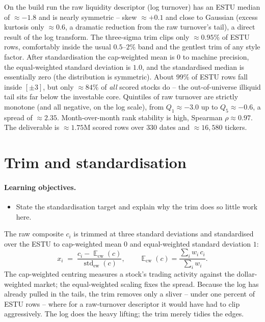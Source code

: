 \documentclass[11pt]{article}
\theoremstyle{definition}
\theoremstyle{plain}
\theoremstyle{remark}
\DeclareMathOperator{\std}{std}
\DeclareMathOperator*{\avg}{\mathbb{E}}
\begin{document}
\begin{observed}
On the build run the raw liquidity descriptor (log turnover) has an ESTU median of $\approx -1.8$ and is nearly symmetric -- skew $\approx +0.1$ and close to Gaussian (excess kurtosis only $\approx 0.6$, a dramatic reduction from the raw turnover's tail), a direct result of the log transform. The three-sigma trim clips only $\approx 0.95\%$ of ESTU rows, comfortably inside the usual $0.5$--$2\%$ band and the gentlest trim of any style factor. After standardisation the cap-weighted mean is $0$ to machine precision, the equal-weighted standard deviation is $1.0$, and the standardised median is essentially zero (the distribution is symmetric). About $99\%$ of ESTU rows fall inside $[\pm 3]$, but only $\approx 84\%$ of \emph{all} scored stocks do -- the out-of-universe illiquid tail sits far below the investable core. Quintiles of raw turnover are strictly monotone (and all negative, on the log scale), from $Q_1 \approx -3.0$ up to $Q_5 \approx -0.6$, a spread of $\approx 2.35$. Month-over-month rank stability is high, Spearman $\rho \approx 0.97$. The deliverable is $\approx 1.75$M scored rows over $330$ dates and $\approx 16{,}580$ tickers.
\end{observed}

\section{Trim and standardisation}\label{sec:std}

\paragraph{Learning objectives.}
\begin{itemize}[leftmargin=1.4em,topsep=2pt]
  \item State the standardisation target and explain why the trim does so little work here.
\end{itemize}

The raw composite $c_i$ is trimmed at three standard deviations and standardised over the ESTU to cap-weighted mean $0$ and equal-weighted standard deviation $1$:
\[
x_i \;=\; \frac{c_i - \avg_{\text{cw}}(c)}{\std_{\text{ew}}(c)},
\qquad
\avg_{\text{cw}}(c) = \frac{\sum_i w_i\, c_i}{\sum_i w_i}.
\]
The cap-weighted centring measures a stock's trading activity against the dollar-weighted market; the equal-weighted scaling fixes the spread. Because the log has already pulled in the tails, the trim removes only a sliver -- under one percent of ESTU rows -- where for a raw-turnover descriptor it would have had to clip aggressively. The log does the heavy lifting; the trim merely tidies the edges.
\end{document}
